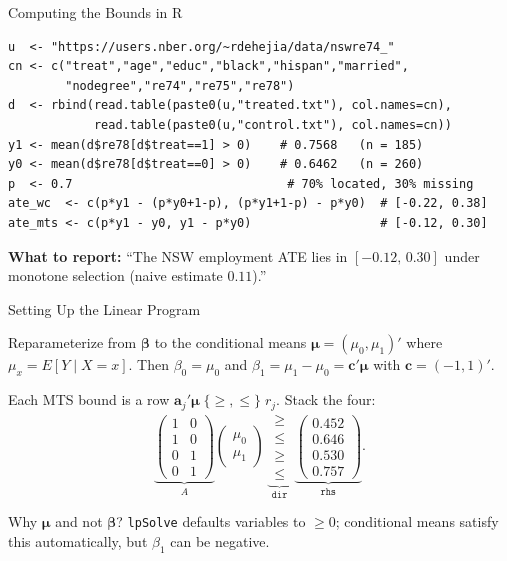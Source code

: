 \documentclass[handout, aspectratio=169]{beamer}
\numberwithin{equation}{section}
\begin{document}
\begin{frame}[fragile]{Computing the Bounds in R}

\begin{lstlisting}
u  <- "https://users.nber.org/~rdehejia/data/nswre74_"
cn <- c("treat","age","educ","black","hispan","married",
        "nodegree","re74","re75","re78")
d  <- rbind(read.table(paste0(u,"treated.txt"), col.names=cn),
            read.table(paste0(u,"control.txt"), col.names=cn))
y1 <- mean(d$re78[d$treat==1] > 0)    # 0.7568   (n = 185)
y0 <- mean(d$re78[d$treat==0] > 0)    # 0.6462   (n = 260)
p  <- 0.7                              # 70% located, 30% missing
ate_wc  <- c(p*y1 - (p*y0+1-p), (p*y1+1-p) - p*y0)  # [-0.22, 0.38]
ate_mts <- c(p*y1 - y0, y1 - p*y0)                  # [-0.12, 0.30]
\end{lstlisting}

\pause
\begin{tcolorbox}[colback=blue!5, colframe=blue!50]
\textbf{What to report:} ``The NSW employment ATE lies in $[-0.12,\,0.30]$ under monotone selection (naive estimate $0.11$).''
\end{tcolorbox}
\end{frame}

\begin{frame}{Setting Up the Linear Program}

Reparameterize from $\bm{\beta}$ to the conditional means $\bm{\mu} = (\mu_0, \mu_1)'$ where $\mu_x = E[Y\mid X{=}x]$.  Then $\beta_0 = \mu_0$ and $\beta_1 = \mu_1 - \mu_0 = \bm{c}'\bm{\mu}$ with $\bm{c} = (-1, 1)'$.

\pause
\smallskip

Each MTS bound is a row $\bm{a}_j'\bm{\mu} \;\{\ge,\le\}\; r_j$.  Stack the four:
$$\underbrace{\begin{pmatrix} 1 & 0 \\ 1 & 0 \\ 0 & 1 \\ 0 & 1 \end{pmatrix}}_{A}\!\begin{pmatrix}\mu_0\\ \mu_1\end{pmatrix}\;\underbrace{\begin{matrix}\ge\\ \le\\ \ge\\ \le\end{matrix}}_{\texttt{dir}}\;\underbrace{\begin{pmatrix}0.452\\ 0.646\\ 0.530\\ 0.757\end{pmatrix}}_{\texttt{rhs}}.$$

\pause
\smallskip

Why $\bm{\mu}$ and not $\bm{\beta}$?  \texttt{lpSolve} defaults variables to $\ge 0$; conditional means satisfy this automatically, but $\beta_1$ can be negative.
\end{frame}
\end{document}
